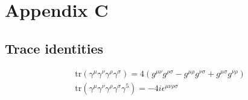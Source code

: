 \documentclass[11pt]{article}
\begin{document}
\pagebreak


\section{Appendix C}
\subsection{Trace identities}
\begin{center}
\begin{align}
&\text{tr} (\gamma^{\mu} \gamma^{\nu} \gamma^{\rho} \gamma^{\sigma}) = 4 (g^{\mu\nu} g^{\rho \sigma} - g^{\mu \rho}g^{\nu \sigma} + g^{\mu \sigma}g^{\nu \rho})\\
& \text{tr} (\gamma^{\mu} \gamma^{\nu} \gamma^{\rho} \gamma^{\sigma} \gamma^5) = -4i \epsilon^{\mu \nu \rho \sigma}
\end{align}
\end{center}
\end{document}
